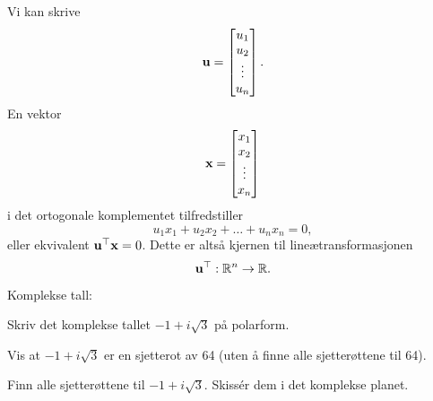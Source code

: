 \begin{losning}

Vi kan skrive $$\mathbf{u}=\begin{bmatrix}
u_1\\
u_2\\
\vdots\\
u_n\\
\end{bmatrix}.$$ En vektor $$\mathbf{x}=\begin{bmatrix}
x_1\\
x_2\\
\vdots\\
x_n\\
\end{bmatrix}$$ i det ortogonale komplementet tilfredstiller $$u_1x_1+u_2x_2+\dots +u_nx_n=0,$$ eller ekvivalent $\mathbf{u}^\top \mathbf{x}=0$. Dette er altså kjernen til lineætransformasjonen $$\mathbf{u}^\top:\mathbb{R}^n\rightarrow \mathbb{R}.$$

\end{losning}



Komplekse tall:



\begin{oppgave}
\begin{punkt}
Skriv det komplekse tallet $-1+i\sqrt{3}$ på polarform.
\end{punkt}

\begin{punkt}
Vis at $-1+i\sqrt{3}$ er en sjetterot av 64 (uten å finne alle sjetterøttene til 64).
\end{punkt}

\begin{punkt}
Finn alle sjetterøttene til $-1+i\sqrt{3}$. Skissér dem i det komplekse planet.
\end{punkt}

\end{oppgave}

